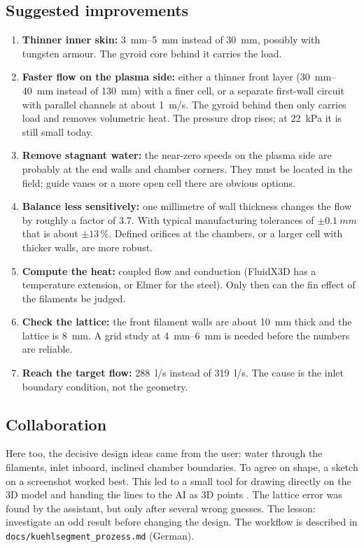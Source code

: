 \documentclass[10pt,a4paper]{article}
\begin{document}
\subsection{Suggested improvements}
\begin{enumerate}\itemsep1pt
\item \textbf{Thinner inner skin:} \SIrange{3}{5}{mm} instead of \SI{30}{mm}, possibly with tungsten armour. The
  gyroid core behind it carries the load.
\item \textbf{Faster flow on the plasma side:} either a thinner front layer (\SIrange{30}{40}{mm} instead of
  \SI{130}{mm}) with a finer cell, or a separate first-wall circuit with parallel channels at about
  \SI{1}{m/s}. The gyroid behind then only carries load and removes volumetric heat. The pressure drop rises;
  at \SI{22}{kPa} it is still small today.
\item \textbf{Remove stagnant water:} the near-zero speeds on the plasma side are probably at the end walls and
  chamber corners. They must be located in the field; guide vanes or a more open cell there are obvious options.
\item \textbf{Balance less sensitively:} one millimetre of wall thickness changes the flow by roughly a factor
  of 3.7. With typical manufacturing tolerances of $\pm\SI{0.1}{mm}$ that is about $\pm13\,\%$. Defined orifices
  at the chambers, or a larger cell with thicker walls, are more robust.
\item \textbf{Compute the heat:} coupled flow and conduction (FluidX3D has a temperature extension, or Elmer for
  the steel). Only then can the fin effect of the filaments be judged.
\item \textbf{Check the lattice:} the front filament walls are about \SI{10}{mm} thick and the lattice is
  \SI{8}{mm}. A grid study at \SIrange{4}{6}{mm} is needed before the numbers are reliable.
\item \textbf{Reach the target flow:} \SI{288}{l/s} instead of \SI{319}{l/s}. The cause is the inlet boundary
  condition, not the geometry.
\end{enumerate}

\subsection{Collaboration}
Here too, the decisive design ideas came from the user: water through the filaments, inlet inboard, inclined
chamber boundaries. To agree on shape, a sketch on a screenshot worked best. This led to a small tool for
drawing directly on the 3D model and handing the lines to the AI as 3D points \cite{sketch}. The lattice error
was found by the assistant, but only after several wrong guesses. The lesson: investigate an odd result before
changing the design. The workflow is described in \texttt{docs/kuehlsegment\_prozess.md} (German).
\end{document}
